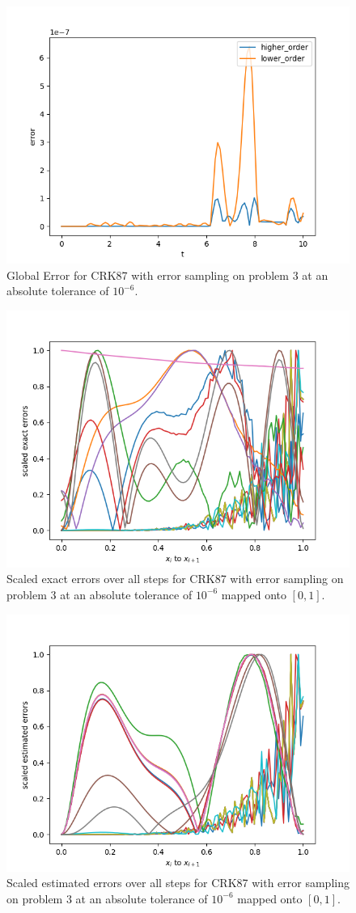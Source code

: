 \begin{figure}[H]
\centering
\includegraphics[width=0.7\linewidth]{./figures/crk87_sampling_p3_global_error}
\caption{Global Error for CRK87 with error sampling on problem 3 at an absolute tolerance of $10^{-6}$.}
\label{fig:crk87_sampling_p3_global_error}
\end{figure}

\begin{figure}[H]
\centering
\includegraphics[width=0.7\linewidth]{./figures/crk87_sampling_p3_scaled_errors}
\caption{Scaled exact errors over all steps for CRK87 with error sampling on problem 3 at an absolute tolerance of $10^{-6}$ mapped onto $[0, 1]$.}
\label{fig:crk87_sampling_p3_scaled_errors}
\end{figure}

\begin{figure}[H]
\centering
\includegraphics[width=0.7\linewidth]{./figures/crk87_sampling_p3_scaled_estimated_errors}
\caption{Scaled estimated errors over all steps for CRK87 with error sampling on problem 3 at an absolute tolerance of $10^{-6}$ mapped onto $[0, 1]$.}
\label{fig:crk87_sampling_p3_scaled_estimated_errors}
\end{figure}

